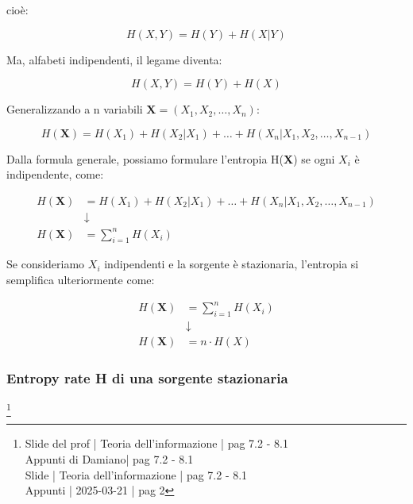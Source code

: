 cioè: 

{
    \Large 
    \begin{equation}
         H(X, Y)
        =
        H (Y) + H(X | Y) 
    \end{equation}
}

Ma, alfabeti indipendenti, il legame diventa: 

{
    \Large 
    \begin{equation}
         H(X, Y)
        =
        H (Y) + H(X) 
    \end{equation}
}

Generalizzando a n variabili $ \textbf{X} = (X_1, X_2, \dots, X_n)$: 

{
    \Large 
    \begin{equation}
        H(\textbf{X})
        =
        H(X_1)
        + 
        H(X_2 | X_1)
        + 
        \dots
        +
        H(X_n | X_1, X_2, \dots, X_{n-1})
    \end{equation}
}

Dalla formula generale, possiamo formulare l'entropia H(\textbf{X}) se ogni $X_i$ è indipendente, come:

{
    \Large 
    \begin{equation}
        \begin{split}
        H(\textbf{X})
        &=
        H(X_1)
        + 
        H(X_2 | X_1)
        + 
        \dots
        +
        H(X_n | X_1, X_2, \dots, X_{n-1})    
        \\
        &\downarrow
        \\
        H(\textbf{X})
        &=
        \sum_{i = 1}^{n}
        H(X_i)
        \end{split}
    \end{equation}
}

Se consideriamo $X_i$ indipendenti e la sorgente è stazionaria, l'entropia si semplifica ulteriormente come: 

{
    \Large 
    \begin{equation}
        \begin{split}
        H(\textbf{X})
        &=
        \sum_{i = 1}^{n}
        H(X_i)  
        \\
        &\downarrow
        \\
        H(\textbf{X})
        &=
        n \cdot H(X)
        \end{split}
    \end{equation}
}

\newpage 

\subsubsection{Entropy rate H di una sorgente stazionaria}
\footnote{Slide del prof | Teoria dell'informazione | pag 7.2 - 8.1 \\  
Appunti di Damiano| pag 7.2 - 8.1 \\
Slide | Teoria dell'informazione | pag 7.2 - 8.1 \\
Appunti | 2025-03-21 | pag 2
}

